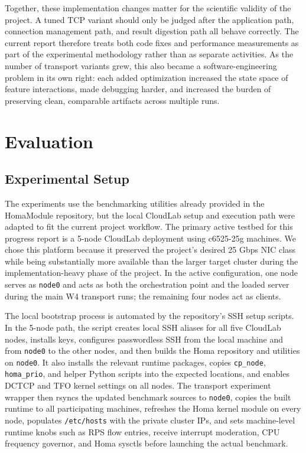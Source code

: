 \documentclass[11pt]{article}
\begin{document}
Together, these implementation changes matter for the scientific validity of the project. A tuned TCP variant should only be judged after the application path, connection management path, and result digestion path all behave correctly. The current report therefore treats both code fixes and performance measurements as part of the experimental methodology rather than as separate activities. As the number of transport variants grew, this also became a software-engineering problem in its own right: each added optimization increased the state space of feature interactions, made debugging harder, and increased the burden of preserving clean, comparable artifacts across multiple runs.

\section{Evaluation}

\subsection{Experimental Setup}

The experiments use the benchmarking utilities already provided in the HomaModule repository, but the local CloudLab setup and execution path were adapted to fit the current project workflow. The primary active testbed for this progress report is a 5-node CloudLab deployment using c6525-25g machines. We chose this platform because it preserved the project's desired 25 Gbps NIC class while being substantially more available than the larger target cluster during the implementation-heavy phase of the project. In the active configuration, one node serves as \texttt{node0} and acts as both the orchestration point and the loaded server during the main W4 transport runs; the remaining four nodes act as clients.

The local bootstrap process is automated by the repository's SSH setup scripts. In the 5-node path, the script creates local SSH aliases for all five CloudLab nodes, installs keys, configures passwordless SSH from the local machine and from \texttt{node0} to the other nodes, and then builds the Homa repository and utilities on \texttt{node0}. It also installs the relevant runtime packages, copies \texttt{cp\_node}, \texttt{homa\_prio}, and helper Python scripts into the expected locations, and enables DCTCP and TFO kernel settings on all nodes. The transport experiment wrapper then rsyncs the updated benchmark sources to \texttt{node0}, copies the built runtime to all participating machines, refreshes the Homa kernel module on every node, populates \texttt{/etc/hosts} with the private cluster IPs, and sets machine-level runtime knobs such as RPS flow entries, receive interrupt moderation, CPU frequency governor, and Homa sysctls before launching the actual benchmark.
\end{document}
